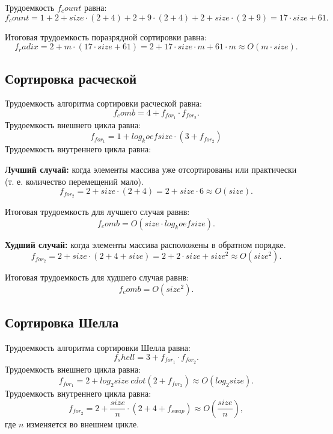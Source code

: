 Трудоемкость $f_count$ равна:
\begin{equation}
	f_count = 1 + 2 + size \cdot (2 + 4) + 2 + 9 \cdot(2 + 4) + 2 + size \cdot (2 + 9) = 17 \cdot size + 61.
\end{equation}

Итоговая трудоемкость поразрядной сортировки равна:
\begin{equation}
	f_radix = 2 + m \cdot (17 \cdot size + 61) = 2 + 17 \cdot size \cdot m + 61 \cdot m \approx O(m \cdot size).
\end{equation}

\subsection*{Сортировка расческой}
Трудоемкость алгоритма сортировки расческой равна:
\begin{equation}
	f_comb = 4 + f_{for_1} \cdot f_{for_2}.
\end{equation}
Трудоемкость внешнего цикла равна:
\begin{equation}
	f_{for_1} = 1 + log_koef{size} \cdot(3 + f_{for_2}) 
\end{equation}
Трудоемкость внутреннего цикла равна:

\textbf{Лучший случай:} когда элементы массива уже отсортированы или практически (т. е. количество перемещений мало).
\begin{equation}
	f_{for_2} = 2 + size \cdot(2 + 4) =  2 + size \cdot 6 \approx O(size).
\end{equation}

Итоговая трудоемкость для лучшего случая равнв: 
\begin{equation}
	f_comb = O(size \cdot log_koef{size}).
\end{equation}

\textbf{Худший случай:} когда элементы массива расположены в обратном порядке.
\begin{equation}
	f_{for_2} = 2 + size \cdot(2 + 4 + size) =  2 + 2 \cdot size + size^2 \approx O(size^2).
\end{equation}

Итоговая трудоемкость для худшего случая равнв: 
\begin{equation}
	f_comb = O(size^2).
\end{equation}

\subsection*{Сортировка Шелла}
Трудоемкость алгоритма сортировки Шелла равна:
\begin{equation}
	f_shell = 3 + f_{for_1} \cdot f_{for_2}.
\end{equation}
Трудоемкость внешнего цикла равна:
\begin{equation}
	f_{for_1} = 2 + log_2{size} \ cdot (2 + f_{for_2}) \approx O(log_2{size}) .
\end{equation}
Трудоемкость внутреннего цикла равна:
\begin{equation}
	f_{for_2} = 2 + \frac{size}{n} \cdot (2 + 4 + f_{swap}) \approx O(\frac{size}{n}), 
\end{equation}
где $n$ изменяется во внешнем цикле.

